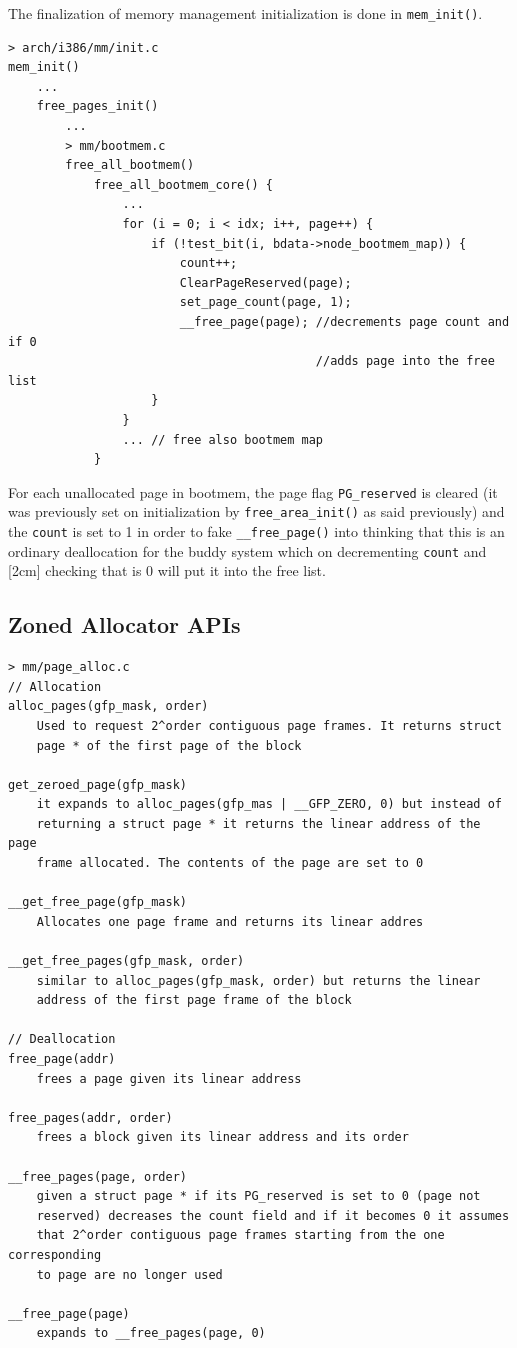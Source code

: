 \documentclass[twoside]{article}
\renewcommand{\cite}[1]{[#1]}
\begin{document}
The finalization of memory management initialization is done in
\texttt{mem_init()}.

\begin{verbatim}
> arch/i386/mm/init.c
mem_init()
    ...
    free_pages_init()
        ...
        > mm/bootmem.c
        free_all_bootmem()
            free_all_bootmem_core() {
                ...
                for (i = 0; i < idx; i++, page++) {
                    if (!test_bit(i, bdata->node_bootmem_map)) {
                        count++;
                        ClearPageReserved(page);
                        set_page_count(page, 1);
                        __free_page(page); //decrements page count and if 0
                                           //adds page into the free list
                    }
                }
                ... // free also bootmem map
            }
\end{verbatim}

For each unallocated page in bootmem, the page flag \texttt{PG_reserved} is
cleared (it was previously set on initialization by
\texttt{free_area_init()} as said previously) and the \texttt{count} is set to 1
in order to fake \texttt{__free_page()} into thinking that this is an ordinary
deallocation for the buddy system which on decrementing \texttt{count} and
\marginnote{(\cite{gorman_2004} Chap. 6), (\cite{mauerer_2010} Sec 3.5.4)}[2cm]
checking that is 0 will put it into the free list.

\subsection{Zoned Allocator APIs}


\begin{verbatim}
> mm/page_alloc.c
// Allocation
alloc_pages(gfp_mask, order)
    Used to request 2^order contiguous page frames. It returns struct
    page * of the first page of the block

get_zeroed_page(gfp_mask)
    it expands to alloc_pages(gfp_mas | __GFP_ZERO, 0) but instead of
    returning a struct page * it returns the linear address of the page
    frame allocated. The contents of the page are set to 0

__get_free_page(gfp_mask)
    Allocates one page frame and returns its linear addres

__get_free_pages(gfp_mask, order)
    similar to alloc_pages(gfp_mask, order) but returns the linear
    address of the first page frame of the block

// Deallocation
free_page(addr)
    frees a page given its linear address

free_pages(addr, order)
    frees a block given its linear address and its order

__free_pages(page, order)
    given a struct page * if its PG_reserved is set to 0 (page not
    reserved) decreases the count field and if it becomes 0 it assumes
    that 2^order contiguous page frames starting from the one corresponding
    to page are no longer used

__free_page(page)
    expands to __free_pages(page, 0)
\end{verbatim}
\end{document}
